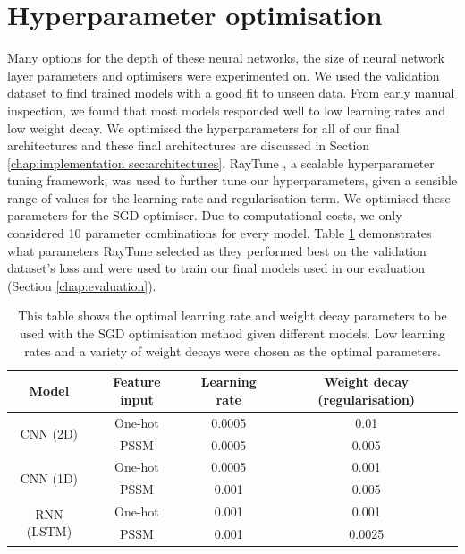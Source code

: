 \documentclass{l4proj}
\begin{document}
\section{Hyperparameter optimisation}
\label{chap:implementation section:hyperparameters}
Many options for the depth of these neural networks, the size of neural network layer parameters and optimisers were experimented on. We used the validation dataset to find trained models with a good fit to unseen data. From early manual inspection, we found that most models responded well to low learning rates and low weight decay. We optimised the hyperparameters for all of our final architectures and these final architectures are discussed in Section \ref{chap:implementation sec:architectures}. RayTune \citep{Liaw:18}, a scalable hyperparameter tuning framework, was used to further tune our hyperparameters, given a sensible range of values for the learning rate and regularisation term. We optimised these parameters for the SGD optimiser. Due to computational costs, we only considered 10 parameter combinations for every model. Table \ref{tab:hyperparameters} demonstrates what parameters RayTune selected as they performed best on the validation dataset's loss and were used to train our final models used in our evaluation (Section \ref{chap:evaluation}).

\begin{table}[!ht]
    \centering
    \caption{This table shows the optimal learning rate and weight decay parameters to be used with the SGD optimisation method given different models. Low learning rates and a variety of weight decays were chosen as the optimal parameters.}
    
    \begin{tabular}{@{}cccc@{}}
    \toprule
    Model & Feature input & Learning rate & Weight decay (regularisation) \\ \midrule
    \multirow{2}{*}{CNN (2D)} & One-hot & 0.0005 & 0.01 \\
     & PSSM & 0.0005 & 0.005 \\
    \multirow{2}{*}{CNN (1D)} & One-hot & 0.0005 & 0.001 \\
     & PSSM & 0.001 & 0.005 \\
    \multirow{2}{*}{RNN (LSTM)} & One-hot & 0.001 & 0.001 \\
     & PSSM & 0.001 & 0.0025 \\ \cmidrule(l){1-4} 
    \end{tabular}

    \label{tab:hyperparameters} 
\end{table}
\end{document}

